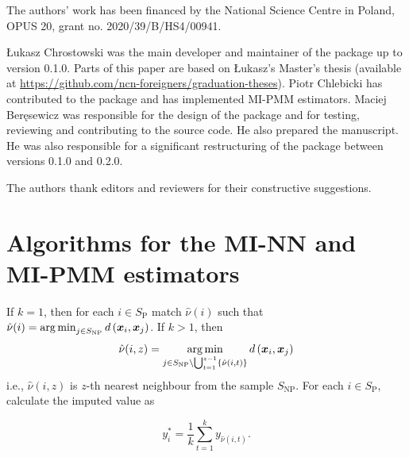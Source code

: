 \documentclass[
]{jss}
\begin{document}
The authors' work has been financed by the National Science Centre in
Poland, OPUS 20, grant no. 2020/39/B/HS4/00941.

Łukasz Chrostowski was the main developer and maintainer of the package
up to version 0.1.0. Parts of this paper are based on Łukasz's Master's
thesis (available at
\url{https://github.com/ncn-foreigners/graduation-theses}). Piotr
Chlebicki has contributed to the package and has implemented MI-PMM
estimators. Maciej Beręsewicz was responsible for the design of the
package and for testing, reviewing and contributing to the source code.
He also prepared the manuscript. He was also responsible for a
significant restructuring of the package between versions 0.1.0 and
0.2.0.

The authors thank editors and reviewers for their constructive
suggestions.




\clearpage

\appendix

\section{Algorithms for the MI-NN and MI-PMM
estimators}\label{sec-details}

\begin{algorithm}[ht!]
\caption{Mass imputation using the $k$ nearest neighbour algorithm}
\label{algo-2}
\begin{algorithmic}[1]
\State If $k=1$, then for each $i \in S_{\text{P}}$ match $\hat{\nu}(i)$ such that
$\hat{\nu}(i)=
\operatornamewithlimits{arg\,min}_{j\in S_{\text{NP}}}d\left(\boldsymbol{x}_i,\boldsymbol{x}_j\right)$.
\State If $k>1$, then
$$\hat{\nu}(i, z) = \operatornamewithlimits{arg\,min}_{j\in S_{\text{NP}}\setminus\bigcup_{t=1}^{z-1}
\{\hat{\nu}(i, t)\}} d\left(\boldsymbol{x}_i, \boldsymbol{x}_j\right)$$
i.e., $\hat{\nu}(i, z)$ is $z$-th nearest neighbour from the sample $S_{\text{NP}}$.\;
\State For each $i \in S_{\text{P}}$, calculate the imputed value as

$$
y_i^* = \frac{1}{k}\sum_{t=1}^{k}y_{\hat{\nu}(i, t)}.
$$
\end{algorithmic}
\end{algorithm}
\end{document}
